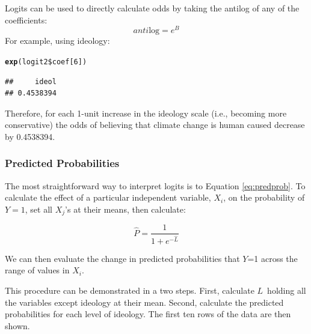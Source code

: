 \documentclass[11pt,openany]{book}\usepackage[]{graphicx}\usepackage[]{color}
\makeatletter
\newcommand{\hlnum}[1]{\textcolor[rgb]{0.686,0.059,0.569}{#1}}%
\newcommand{\hlopt}[1]{\textcolor[rgb]{0,0,0}{#1}}%
\newcommand{\hlstd}[1]{\textcolor[rgb]{0.345,0.345,0.345}{#1}}%
\newcommand{\hlkwd}[1]{\textcolor[rgb]{0.737,0.353,0.396}{\textbf{#1}}}%
\newenvironment{kframe}{%
 \def\at@end@of@kframe{}%
 \ifinner\ifhmode%
  \def\at@end@of@kframe{\end{minipage}}%
  \begin{minipage}{\columnwidth}%
 \fi\fi%
 \def\FrameCommand##1{\hskip\@totalleftmargin \hskip-\fboxsep
 \colorbox{shadecolor}{##1}\hskip-\fboxsep
     \hskip-\linewidth \hskip-\@totalleftmargin \hskip\columnwidth}%
 \MakeFramed {\advance\hsize-\width
   \@totalleftmargin\z@ \linewidth\hsize
   \@setminipage}}%
 {\par\unskip\endMakeFramed%
 \at@end@of@kframe}
\newenvironment{knitrout}{}{} %
\renewenvironment{knitrout}{\begin{singlespace}}{\end{singlespace}}
\makeatother
\begin{document}
Logits can be used to directly calculate odds by taking the antilog of any of the coefficients: 
\begin{equation*}
  \textit{anti}\text{log} = e^B 
\end{equation*}
\noindent For example, using ideology:
\begin{knitrout}
\color{fgcolor}\begin{kframe}
\begin{alltt}
\hlkwd{exp}\hlstd{(logit2}\hlopt{\$}\hlstd{coef[}\hlnum{6}\hlstd{])}
\end{alltt}
\begin{verbatim}
##     ideol 
## 0.4538394
\end{verbatim}
\end{kframe}
\end{knitrout}
\noindent Therefore, for each 1-unit increase in the ideology scale (i.e., becoming more conservative) the odds of believing that climate change is human caused decrease by 0.4538394. 

\subsubsection{Predicted Probabilities}

The most straightforward way to interpret logits is to Equation \ref{eq:predprob}. To calculate the effect of a particular independent variable, $X_i$, on the probability of $Y = 1$, set all $X_j$'s at their means, then calculate:

\begin{equation*}
\label{eq:predprob}
  \hat{P} = \frac{1}{1+e^{-\hat{L}}}
\end{equation*}

\noindent We can then evaluate the change in predicted probabilities that $Y$=1 across the range of values in $X_i$.

This procedure can be demonstrated in a two steps. First, calculate $L$\ holding all the variables except ideology at their mean. Second, calculate the predicted probabilities for each level of ideology. The first ten rows of the data are then shown.  
\end{document}

